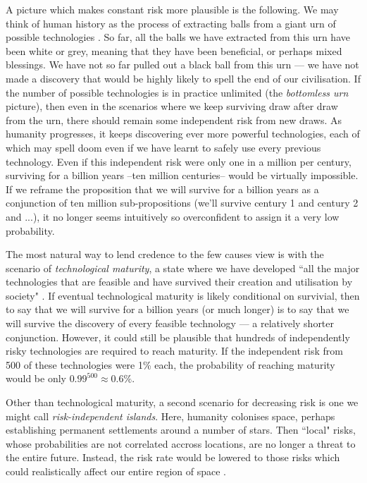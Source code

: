 \documentclass[british]{article}
\begin{document}
A picture which makes constant risk more plausible is the following. We may think of human history as the process of extracting balls from a giant urn of possible technologies \citep{bostrom_existential_2013}. So far, all the balls we have extracted from this urn have been white or grey, meaning that they have been beneficial, or perhaps mixed blessings. We have not so far pulled out a black ball from this urn --- we have not made a discovery that would be highly likely to spell the end of our civilisation. If the number of possible technologies is in practice unlimited (the \emph{bottomless urn} picture), then even in the scenarios where we keep surviving draw after draw from the urn, there should remain some independent risk from new draws. As humanity progresses, it keeps discovering ever more powerful technologies, each of which may spell doom even if we have learnt to safely use every previous technology. Even if this independent risk were only one in a million per century, surviving
for a billion years --ten million centuries-- would be virtually impossible. If we reframe the proposition that we will survive for a billion years as a conjunction of ten million sub-propositions (we'll survive century 1 and century 2 and ...), it no longer seems intuitively so overconfident to assign it a very low probability.

The most natural way to lend credence to the few causes view is with the scenario of \emph{technological maturity}, a state where we have developed ``all the major technologies that are feasible and have survived their creation and utilisation by society" \citep{ord_modelling_2014}. If eventual technological maturity is likely conditional on survivial, then to say that we will survive for a billion years (or much longer) is to say that we will survive the discovery of every feasible technology --- a relatively shorter conjunction. However, it could still be plausible that hundreds of independently risky technologies are required to reach maturity. If the independent risk from 500 of these technologies were 1\% each, the probability of reaching maturity would be only $0.99^{500}\approx0.6\%$.

Other than technological maturity, a second scenario for decreasing risk is one we might call \emph{risk-independent islands}. Here,
humanity colonises space, perhaps establishing permanent settlements
around a number of stars. Then ``local" risks, whose probabilities are
not correlated accross locations, are no longer a threat to the entire
future. Instead, the risk rate would be lowered to
those risks which could realistically affect our entire region of
space \citep{ord_modelling_2014}.
\end{document}
